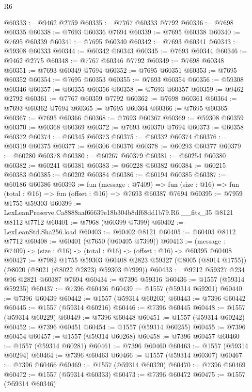 \begin{lexlean}{R6}
\begin{coremodule}
@60333 := @9462 @2759
@60335 := @7767 @60333 @7792
@60336 := @7698 @60335
@60338 := @7693 @60336 @7694
@60339 := @7695 @60338
@60340 := @7695 @60339
@60341 := @7695 @60340
@60342 := @7693 @60341
@60343 := @59308 @60333
@60344 := @60342 @60343
@60345 := @7693 @60344
@60346 := @9462 @2775
@60348 := @7767 @60346 @7792
@60349 := @7698 @60348
@60351 := @7693 @60349 @7694
@60352 := @7695 @60351
@60353 := @7695 @60352
@60354 := @7695 @60353
@60355 := @7693 @60354
@60356 := @59308 @60346
@60357 := @60355 @60356
@60358 := @7693 @60357
@60359 := @9462 @2792
@60361 := @7767 @60359 @7792
@60362 := @7698 @60361
@60364 := @7693 @60362 @7694
@60365 := @7695 @60364
@60366 := @7695 @60365
@60367 := @7695 @60366
@60368 := @7693 @60367
@60369 := @59308 @60359
@60370 := @60368 @60369
@60372 := @7693 @60370 @7694
@60373 := @60358 @60372
@60374 := @60345 @60373
@60375 := @60332 @60374
@60376 := @60319 @60375
@60377 := @60306 @60376
@60378 := @60293 @60377
@60379 := @60280 @60378
@60380 := @60267 @60379
@60381 := @60254 @60380
@60382 := @60241 @60381
@60383 := @60228 @60382
@60384 := @60215 @60383
@60385 := @60202 @60384
@60386 := @60194 @60385
@60387 := @60186 @60386
@60393 := fun (message : @7409) =>
  fun (size : @16) => fun (total : @16) => fun (offset : @16) => @7693 @60387 @7694
@60395 := @7959 @1755 @59303
@60399 := LexLeanPreserve.Ca8888aaf66639e18b304b8df68dd1b79.R6.__fits_35 @8121 @8112 @7712
@60401 := @7968 (@60399 @7399)
@60402 := LexLeanStd.Sha256.load
@60403 := @60402 @8121
@60405 := @60403 @8112 @7712
@60408 := @60401 (@7650 (@60405 @7399))
@60413 := (message : @7409) -> (size : @16) -> (total : @16) -> (offset : @16) -> @60395 @60408
@60427 := @7982
    @1755
    @59303
    @60408
    @2823
    @59327
    (@8005 (@8014 @1755))
    (@8020 (@8021 (@8022 @2823) @59303 @7999))
@60433 := @9212 @59327 @234 @96 @2821 @60387 @7694
@60434 := @7396 @59316
@60436 := @1557 (@59314 @59235)
@60437 := @7396 @60436
@60439 := @1557 (@59314 @59201)
@60440 := @7396 @60439
@60442 := @1557 (@59314 @60203)
@60443 := @7396 @60442
@60445 := @1557 (@59314 @60216)
@60446 := @7396 @60445
@60448 := @1557 (@59314 @60229)
@60449 := @7396 @60448
@60451 := @1557 (@59314 @60242)
@60452 := @7396 @60451
@60454 := @1557 (@59314 @60255)
@60455 := @7396 @60454
@60457 := @1557 (@59314 @60268)
@60458 := @7396 @60457
@60460 := @1557 (@59314 @60281)
@60461 := @7396 @60460
@60463 := @1557 (@59314 @60294)
@60464 := @7396 @60463
@60466 := @1557 (@59314 @60307)
@60467 := @7396 @60466
@60469 := @1557 (@59314 @60320)
@60470 := @7396 @60469
@60472 := @1557 (@59314 @60333)
@60473 := @7396 @60472
@60475 := @1557 (@59314 @60346)

\end{coremodule}
\end{lexlean}
